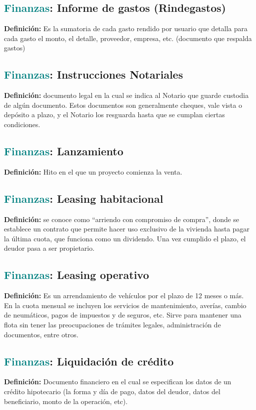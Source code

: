 \documentclass[12pt]{article}
\begin{document}
\subsection{\textcolor{teal}{Finanzas}: Informe de gastos (Rindegastos)}
\textbf{Definición:} Es la sumatoria de cada gasto rendido por usuario que detalla para cada gasto el monto, el detalle, proveedor, empresa, etc. (documento que respalda gastos)
\subsection{\textcolor{teal}{Finanzas}: Instrucciones Notariales}
\textbf{Definición:} documento legal en la cual se indica al Notario que guarde custodia de algún documento. Estos documentos son generalmente cheques, vale vista o depósito a plazo, y el Notario los resguarda hasta que se cumplan ciertas condiciones. 
\subsection{\textcolor{teal}{Finanzas}: Lanzamiento}
\textbf{Definición:} Hito en el que un proyecto comienza la venta.
\subsection{\textcolor{teal}{Finanzas}: Leasing habitacional}
\textbf{Definición:} se conoce como “arriendo con compromiso de compra”, donde se establece un contrato que permite hacer uso exclusivo de la vivienda hasta pagar la última cuota, que funciona como un dividendo. Una vez cumplido el plazo, el deudor pasa a ser propietario.
\subsection{\textcolor{teal}{Finanzas}: Leasing operativo}
\textbf{Definición:} Es un arrendamiento de vehículos por el plazo de 12 meses o más. En la cuota mensual se incluyen los servicios de mantenimiento, averías, cambio de neumáticos, pagos de impuestos y de seguros, etc. Sirve para mantener una flota sin tener las preocupaciones de trámites legales, administración de documentos, entre otros.
\subsection{\textcolor{teal}{Finanzas}: Liquidación de crédito}
\textbf{Definición:} Documento financiero en el cual se especifican los datos de un crédito hipotecario (la forma y día de pago, datos del deudor, datos del beneficiario, monto de la operación, etc).
\end{document}
